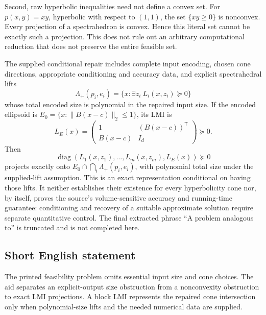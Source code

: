 \documentclass[11pt]{article}
\begin{document}
Second, raw hyperbolic inequalities need not define a convex set. For \(p(x,y)=xy\), hyperbolic with respect to \((1,1)\), the set \(\{xy\ge0\}\) is nonconvex. Every projection of a spectrahedron is convex. Hence this literal set cannot be exactly such a projection. This does not rule out an arbitrary computational reduction that does not preserve the entire feasible set.

The supplied conditional repair includes complete input encoding, chosen cone directions, appropriate conditioning and accuracy data, and explicit spectrahedral lifts
\[
 \Lambda_+(p_i,e_i)=\{x:\exists z_i\ L_i(x,z_i)\succeq0\}
\]
whose total encoded size is polynomial in the repaired input size. If the encoded ellipsoid is \(E_0=\{x:\|B(x-c)\|_2\le1\}\), its LMI is
\[
 L_E(x)=\begin{pmatrix}1&(B(x-c))^{\mathsf T}\\ B(x-c)&I_d\end{pmatrix}\succeq0.
\]
Then
\[
 \operatorname{diag}(L_1(x,z_1),\ldots,L_m(x,z_m),L_E(x))\succeq0
\]
projects exactly onto \(E_0\cap\bigcap_i\Lambda_+(p_i,e_i)\), with polynomial total size under the supplied-lift assumption. This is an exact representation conditional on having those lifts. It neither establishes their existence for every hyperbolicity cone nor, by itself, proves the source's volume-sensitive accuracy and running-time guarantee: conditioning and recovery of a suitable approximate solution require separate quantitative control. The final extracted phrase ``A problem analogous to'' is truncated and is not completed here.
\subsection{Short English statement}
The printed feasibility problem omits essential input size and cone choices. The aid separates an explicit-output size obstruction from a nonconvexity obstruction to exact LMI projections. A block LMI represents the repaired cone intersection only when polynomial-size lifts and the needed numerical data are supplied.
\end{document}
